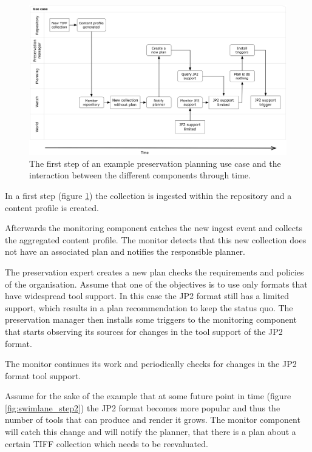 \begin{figure}[bh]
\begin{center}
\includegraphics[width=6in]{figures/related/swimlane_step1.png}
\caption{The first step of an example preservation planning use case and the interaction between the different components through time.}
\label{fig:swimlane_step1}
\end{center}
\end{figure}

In a first step (figure \ref{fig:swimlane_step1}) the collection is ingested within the repository and a content profile is created.

Afterwards the monitoring component catches the new ingest event and collects the aggregated content profile. The monitor detects that this new collection does not have an associated plan and notifies the responsible planner.

The preservation expert creates a new plan checks the requirements and policies of the organisation. Assume that one of the objectives is to use only formats that have widespread tool support. In this case the JP2 format still has a limited support, which results in a plan recommendation to keep the status quo. The preservation manager then installs some triggers to the monitoring component that starts observing its sources for changes in the tool support of the JP2 format.

The monitor continues its work and periodically checks for changes in the JP2 format tool support.

Assume for the sake of the example that at some future point in time (figure \ref{fig:swimlane_step2}) the JP2 format becomes more popular and thus the number of tools that can produce and render it grows. The monitor component will catch this change and will notify the planner, that there is a plan about a certain TIFF collection which needs to be reevaluated.

